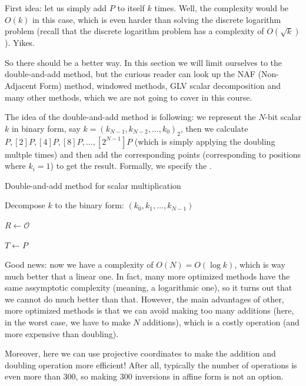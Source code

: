 \documentclass[../lecture-notes.tex]{subfiles}
\begin{document}
First idea: let us simply add $P$ to itself $k$ times. Well, the complexity would be $O(k)$ in this case, which is even harder than solving the discrete logarithm problem (recall that the discrete logarithm problem has a complexity of $O(\sqrt{k})$). Yikes.

So there should be a better way. In this section we will limit ourselves to the double-and-add method, but the curious reader can look up the NAF (Non-Adjacent Form) method, windowed methods, GLV scalar decomposition and many other methods, which we are not going to cover in this course.

The idea of the double-and-add method is following: we represent the $N$-bit scalar $k$ in binary form, say $k = (k_{N-1},k_{N-2},\dots,k_0)_2$, then we calculate $P, [2]P, [4]P, [8]P, \dots, [2^{N-1}]P$ (which is simply applying the doubling multple times) and then add the corresponding points (corresponding to positions where $k_i=1$) to get the result. Formally, we specify the .

\begin{algorithm}
    \caption{Double-and-add method for scalar multiplication}\label{alg:double_and_add}
    
    Decompose $k$ to the binary form: $(k_0,k_1,\dots,k_{N-1})$
    
    $R \gets \mathcal{O}$
    
    $T \gets P$
    
    
\end{algorithm}    

Good news: now we have a complexity of $O(N)=O(\log k)$, which is way much better that a linear one. In fact, many more optimized methods have the same assymptotic complexity (meaning, a logarithmic one), so it turns out that 
we cannot do much better than that. However, the main advantages of other, more optimized methods is that we can avoid making too many additions (here, in the worst case, we have to make $N$ additions), which is a costly operation (and more expensive than doubling).

Moreover, here we can use projective coordinates to make the addition and doubling operation more efficient! After all, typically the number of operations is even more than $300$, so making $300$ inversions in affine form is not an option.
\end{document}
